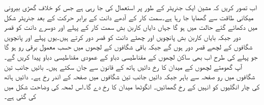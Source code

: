 اب  تصور کریں کہ مشین ایک جنریٹر کے طور پر استعمال کی جا رہی ہے جس کو خلاف  گھڑی  بیرونی میکانی طاقت سے گھمایا جا رہا ہے۔سمت کار کے آدھے دانت کے برابر حرکت  کے بعد جنریٹر  شکل  میں دکھائے گئے حالت میں ہو گا جہاں  دایاں کاربن بش سمت کار کے پہلے اور دوسرے دانت کو قصر دور جبکہ بایاں کاربن بش  پانچویں اور چھٹے دانت کو قصر دور کرتے ہیں۔یوں پہلے اور پانچویں شگافوں کے لچھے قصر دور ہوں گے جبکہ باقی شگافوں کے لچھوں میں حسب معمول برقی رو ہو گا جو پہلے کی طرح اب بھی ساکن لچھوں کے مقناطیسی دباو کے عمودی  مقناطیسی دباو پیدا کریں گے۔آپ گھومتے لچھوں کے میدان کا رخ دائیں ہاتھ کے قانون سے جان سکتے ہیں۔ بائیں جانب تین شگافوں میں رو صفحہ سے باہر جبکہ دائیں جانب تین شگافوں میں صفحہ کے اندر رخ ہے۔ دائیں ہاتھ کی چار انگلیوں کو انہیں کے رخ گھمائیں۔ انگوٹھا میدان کا  رخ  دے گا۔اس لمحہ کی وضاحت شکل   میں کی گئی ہے۔
